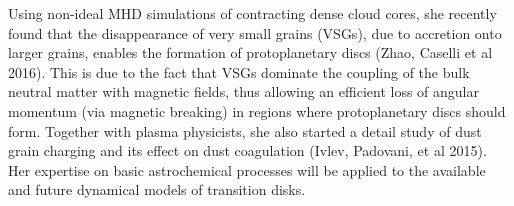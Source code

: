 \documentclass[10pt,fleqn,twoside]{article}
\begin{document}
Using non-ideal MHD simulations of contracting dense cloud cores, she recently found that the disappearance of very small grains (VSGs), due to accretion onto larger grains, enables the formation of protoplanetary discs (Zhao, Caselli et al 2016). This is due to the fact that VSGs dominate the coupling of the bulk neutral matter with magnetic fields, thus allowing an efficient loss of angular momentum (via magnetic breaking) in regions where protoplanetary discs should form. Together with plasma physicists, she also started a detail study of dust grain charging and its effect on dust coagulation (Ivlev, Padovani, et al 2015).
Her expertise on basic astrochemical
processes will be applied to the available and future dynamical models
of transition disks. \\
\end{document}
